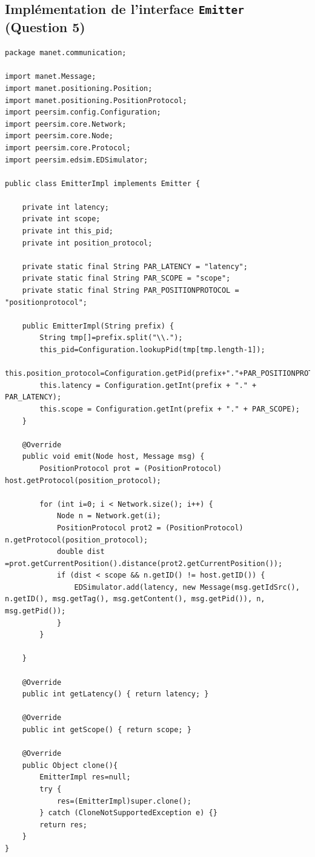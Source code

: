 \documentclass[a4paper]{article}
\begin{document}
\subsection{Implémentation de l'interface \texttt{Emitter} (Question 5)}
\begin{verbatim}
package manet.communication;

import manet.Message;
import manet.positioning.Position;
import manet.positioning.PositionProtocol;
import peersim.config.Configuration;
import peersim.core.Network;
import peersim.core.Node;
import peersim.core.Protocol;
import peersim.edsim.EDSimulator;

public class EmitterImpl implements Emitter {

    private int latency;
    private int scope;
    private int this_pid;
    private int position_protocol;

    private static final String PAR_LATENCY = "latency";
    private static final String PAR_SCOPE = "scope";
    private static final String PAR_POSITIONPROTOCOL = "positionprotocol";

    public EmitterImpl(String prefix) {
        String tmp[]=prefix.split("\\.");
        this_pid=Configuration.lookupPid(tmp[tmp.length-1]);
        this.position_protocol=Configuration.getPid(prefix+"."+PAR_POSITIONPROTOCOL);
        this.latency = Configuration.getInt(prefix + "." + PAR_LATENCY);
        this.scope = Configuration.getInt(prefix + "." + PAR_SCOPE);
    }

    @Override
    public void emit(Node host, Message msg) {
        PositionProtocol prot = (PositionProtocol) host.getProtocol(position_protocol);

        for (int i=0; i < Network.size(); i++) {
            Node n = Network.get(i);
            PositionProtocol prot2 = (PositionProtocol) n.getProtocol(position_protocol);
            double dist =prot.getCurrentPosition().distance(prot2.getCurrentPosition());
            if (dist < scope && n.getID() != host.getID()) {
                EDSimulator.add(latency, new Message(msg.getIdSrc(), n.getID(), msg.getTag(), msg.getContent(), msg.getPid()), n, msg.getPid());
            }
        }

    }

    @Override
    public int getLatency() { return latency; }

    @Override
    public int getScope() { return scope; }

    @Override
    public Object clone(){
        EmitterImpl res=null;
        try {
            res=(EmitterImpl)super.clone();
        } catch (CloneNotSupportedException e) {}
        return res;
    }
}
\end{verbatim}
\end{document}
